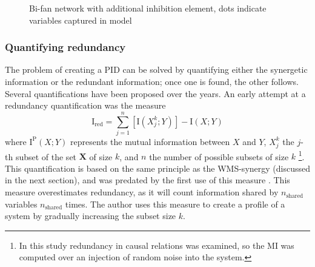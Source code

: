 \documentclass[../main.tex]{subfiles}
\begin{document}
\begin{figure}[ht]
\begin{center}
\end{center}
\caption{Bi-fan network with additional inhibition element, dots indicate variables captured in model}
\label{bifan_syn}
\end{figure}

\subsubsection{Quantifying redundancy}

The problem of creating a PID can be solved by quantifying either the synergetic information or the redundant information; once one is found, the other follows.
Several quantifications have been proposed over the years.
An early attempt at a redundancy quantification was the measure
%
\begin{equation}
\mathrm{I}_\mathrm{red} = \sum_{j=1}^n [\mathrm{I}(X_j^k;Y)] - \mathrm{I}(X;Y)
\end{equation}
%
where $\mathrm{I}^\mathrm{P}(X;Y)$ represents the mutual information between $X$ and $Y$, $X_j^k$ the $j$-th subset of the set $\mathbf{X}$ of size $k$, and $n$ the number of possible subsets of size $k$ \cite{tononi1999measures}\footnote{In this study redundancy in causal relations was examined, so the MI was computed over an injection of random noise into the system.}.
This quantification is based on the same principle as the WMS-synergy (discussed in the next section), and was predated by the first use of this measure \cite{gawne1993independent}.
This measure overestimates redundancy, as it will count information shared by $n_\mathrm{shared}$ variables $n_\mathrm{shared}$ times.
The author uses this measure to create a profile of a system by gradually increasing the subset size $k$.
\end{document}
